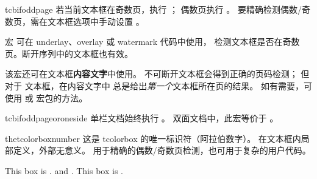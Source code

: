 \clearpage
\begin{docCommand}[doc new=2015-11-13]{tcbifoddpage}{}
若当前文本框在奇数页，执行 ；
偶数页执行 。
要精确检测偶数/奇数页，需在文本框选项中手动设置 。

宏  可在 underlay、overlay 或 watermark 代码中使用，
检测文本框是否在奇数页。断开序列中的文本框也有效。

该宏还可在文本框\textbf{内容文字}中使用。
不可断开文本框会得到正确的页码检测；
但对于  文本框，在内容文字中
 总是给出\emph{第一个}文本框所在页的结果。
如有需要，可使用  或  宏包的方法。

\begin{dispExample}

\begin{tcolorbox}[enhanced,check odd page,
  title={Example for a box on an \tcbifoddpage{odd}{even} page},
  watermark text={\tcbifoddpage{Odd}{Even} page!}]
\lipsum[1]
\end{tcolorbox}
\end{dispExample}
\end{docCommand}


\begin{docCommand}[doc new=2016-11-18]{tcbifoddpageoroneside}{}
  单栏文档始终执行 。
  双面文档中，此宏等价于 。
\end{docCommand}

\clearpage
\begin{docCommand}[doc new=2015-11-13]{thetcolorboxnumber}{}
这是 tcolorbox 的唯一标识符（阿拉伯数字）。
在文本框内局部定义，外部无意义。
用于精确的偶数/奇数页检测，也可用于复杂的用户代码。

\begin{dispExample}
\begin{tcolorbox}[colback=yellow!5,title=Box \thetcolorboxnumber]
  This box is \thetcolorboxnumber.
   and
  .
  This box is \thetcolorboxnumber.
\end{tcolorbox}
\end{dispExample}
\end{docCommand}


